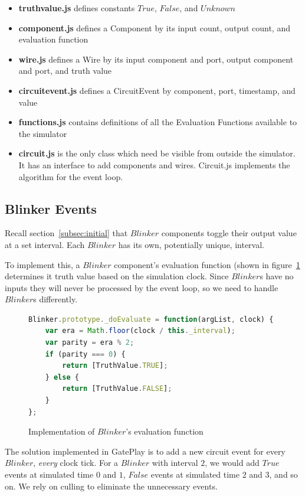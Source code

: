 \begin{itemize}
	\item \textbf{truthvalue.js} defines constants $True$, $False$, and $Unknown$
	\item \textbf{component.js} defines a Component by its input count, output count, and evaluation function
	\item \textbf{wire.js} defines a Wire by its input component and port, output component and port, and truth value
	\item \textbf{circuitevent.js} defines a CircuitEvent by component, port, timestamp, and value
	\item \textbf{functions.js} contains definitions of all the Evaluation Functions available to the simulator 
	\item \textbf{circuit.js} is the only class which need be visible from outside the simulator. It has an interface to add components and wires. Circuit.js implements the algorithm for the event loop. 
\end{itemize}

\subsection{Blinker Events}
Recall section~\ref{subsec:initial} that $Blinker$ components toggle their output value at a set interval. Each $Blinker$ has its own, potentially unique, interval.

To implement this, a $Blinker$ component's evaluation function (shown in figure~\ref{fig:blinkereval} determines it truth value based on the simulation clock. Since $Blinker$s have no inputs they will never be processed by the event loop, so we need to handle $Blinker$s differently.

\begin{figure}
\begin{lstlisting}[language=JavaScript]
Blinker.prototype._doEvaluate = function(argList, clock) {
    var era = Math.floor(clock / this._interval);
    var parity = era % 2;
    if (parity === 0) {
        return [TruthValue.TRUE];
    } else {
        return [TruthValue.FALSE];
    }
};
\end{lstlisting}
\caption{Implementation of $Blinker$'s evaluation function}
\label{fig:blinkereval}
\end{figure}

The solution implemented in GatePlay is to add a new circuit event for every $Blinker$, \textit{every} clock tick. For a $Blinker$ with interval $2$, we would add $True$ events at simulated time $0$ and $1$, $False$ events at simulated time $2$ and $3$, and so on. We rely on culling to eliminate the unnecessary events.

